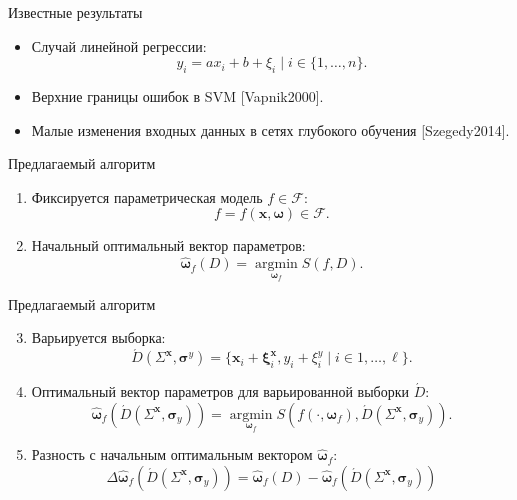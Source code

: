 \documentclass{beamer}
\begin{document}
\begin{frame}{Известные результаты}
  \begin{itemize}
    \item Случай линейной регрессии:
      \[
        y_i = ax_i + b + \xi_i \mid i \in \{ 1, \dots, n \}.
      \]
    \item Верхние границы ошибок в SVM [Vapnik2000].
    \item Малые изменения входных данных в сетях глубокого обучения [Szegedy2014].
  \end{itemize}
\end{frame}

\begin{frame}{Предлагаемый алгоритм}
  \begin{enumerate}
    \item Фиксируется параметрическая модель $f \in \mathcal{F}$:
      \[
        f = f(\mathbf{x}, \boldsymbol{\omega}) \in \mathcal{F}.
      \]
    \item Начальный оптимальный вектор параметров:
      \[
        \hat{\boldsymbol{\omega}}_f(D) = \mathop{\arg \min}\limits_{\boldsymbol{\omega}_f} S(f, D).
      \]
  \end{enumerate}
\end{frame}

\begin{frame}{Предлагаемый алгоритм}
  \begin{enumerate}
    \setcounter{enumi}{2}
    \item Варьируется выборка:
      \[
        \acute{D}(\Sigma^{\mathbf{x}}, \boldsymbol{\sigma}^y) = \{ \mathbf{x}_i + \boldsymbol{\xi}^{\mathbf{x}}_i, y_i + \xi^y_i \mid i \in 1, \dots, \ell \}.
      \]
    \item Оптимальный вектор параметров для варьированной выборки $\acute{D}$:
      \[
    		\hat{\boldsymbol{\omega}}_f (\acute{D} (\Sigma^{\mathbf{x}}, \boldsymbol{\sigma}_y)) = \mathop{\arg \min}\limits_{\boldsymbol{\omega}_f} S (f (\cdot, \boldsymbol{\omega}_f), \acute{D} (\Sigma^{\mathbf{x}}, \boldsymbol{\sigma}_y)).
      \]
    \item Разность с начальным оптимальным вектором $\hat{\boldsymbol{\omega}}_f$:
      \[
        \Delta\hat{\boldsymbol{\omega}}_f(\acute{D} (\Sigma^{\mathbf{x}}, \boldsymbol{\sigma}_y) ) = \hat{\boldsymbol{\omega}}_f(D) - \hat{\boldsymbol{\omega}}_f (\acute{D} (\Sigma^{\mathbf{x}}, \boldsymbol{\sigma}_y))
      \]
   \end{enumerate}
\end{frame}
\end{document}

